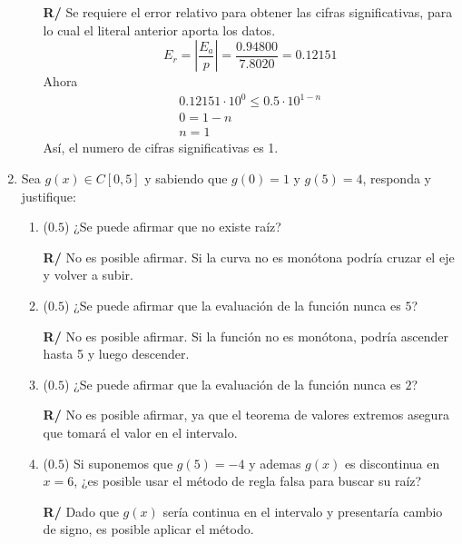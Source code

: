 \documentclass[12pt]{article}
\begin{document}
\begin{enumerate}[leftmargin=*,widest=9]
\begin{enumerate}[label=\alph*]
\textbf{R/} Se requiere el error relativo para obtener las cifras significativas, para lo cual el literal anterior aporta los datos.
\[E_r = \left| \frac{E_a}{p}\right| = \frac{0.94800}{7.8020} = 0.12151\]
Ahora
\begin{eqnarray*}
0.12151 \cdot 10^0 \leq 0.5 \cdot 10^{1-n} \\ 0 = 1-n \\ n = 1
\end{eqnarray*}
Así, el numero de cifras significativas es 1.

\end{enumerate}

   \item Sea \(g(x) \in C[0, 5]\) y sabiendo que \(g(0)= 1\) y \(g(5)=4\), responda y justifique:

   \begin{enumerate}[label=\alph*]
    \item (\(0.5\)) ¿Se puede afirmar que no existe raíz?


    \textbf{R/} No es posible afirmar. Si la curva no es monótona podría cruzar el eje y volver a subir.

\item (\(0.5\)) ¿Se puede afirmar que la evaluación de la función nunca es \(5\)?


\textbf{R/} No es posible afirmar. Si la función no es monótona, podría ascender hasta 5 y luego descender.

\item (\(0.5\)) ¿Se puede afirmar que la evaluación de la función nunca es \(2\)?


\textbf{R/} No es posible afirmar, ya que el teorema de valores extremos asegura que tomará el valor en el intervalo.

\item (\(0.5\)) Si suponemos que \(g(5)=-4\) y ademas \(g(x)\) es discontinua en \(x=6\), ¿es posible usar el método de regla falsa para buscar su raíz?


\textbf{R/} Dado que \(g(x) \) sería continua en el intervalo y presentaría cambio de signo, es posible aplicar el método.

  \end{enumerate}
\end{enumerate}
\end{document}
